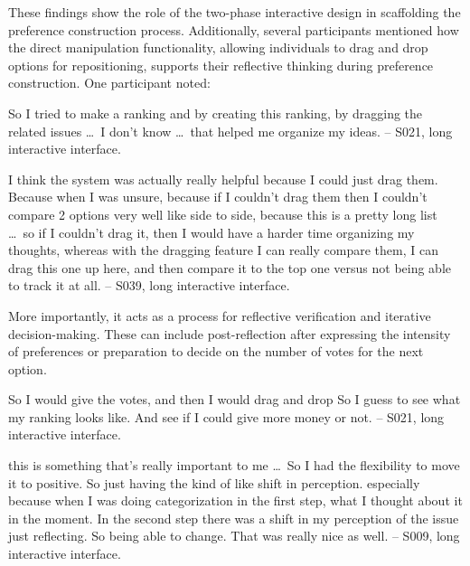 These findings show the role of the two-phase interactive design in scaffolding the preference construction process. Additionally, several participants mentioned how the direct manipulation functionality, allowing individuals to drag and drop options for repositioning, supports their reflective thinking during preference construction. One participant noted:
\begin{displayquote}
So I tried to make a ranking \bracketellipsis and by creating this ranking, by dragging the related issues \ldots\ I don’t know \ldots\ that helped me organize my ideas.
\noindent \hfill -- S021, long interactive interface.
\end{displayquote}

\begin{displayquote}
I think the system was actually really helpful because I could just drag them. \bracketellipsis Because when I was unsure, because if I couldn't drag them then I couldn't compare 2 options very well like side to side, because this is a pretty long list \ldots\ so if I couldn't drag it, then I would have a harder time organizing my thoughts, whereas with the dragging feature I can really compare them, I can drag this one up here, and then compare it to the top one versus not being able to track it at all.
\noindent \hfill -- S039, long interactive interface.
\end{displayquote}

More importantly, it acts as a process for reflective verification and iterative decision-making. These can include post-reflection after expressing the intensity of preferences or preparation to decide on the number of votes for the next option.

\begin{displayquote}
So I would give the votes, and then I would drag and drop \bracketellipsis So I guess to see what my ranking looks like. And see if I could give more money or not.
\noindent \hfill -- S021, long interactive interface.
\end{displayquote}

\begin{displayquote}
\bracketellipsis this is something that's really important to me \ldots\ So I had the flexibility to move it to positive. So just having the kind of like shift in perception. \bracketellipsis especially because when I was doing categorization in the first step, \bracketellipsis what I thought about it in the moment. \bracketellipsis In the second step there was a shift in my perception of the issue just reflecting. So being able to change. That was really nice as well.
\noindent \hfill -- S009, long interactive interface.
\end{displayquote}

